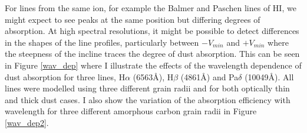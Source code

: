 For lines from the same ion, for example the Balmer and Paschen lines of 
HI, we might expect to see peaks at the same position but differing 
degrees of absorption. At high spectral resolutions, it might be possible 
to detect differences in the shapes of the line profiles, particularly 
between $-V_{min}$ and $+V_{min}$ where the steepness of the incline 
traces the degree of dust absorption.  This can be seen in Figure 
\ref{wav_dep} where I illustrate the effects of the wavelength dependence 
of dust absorption for three lines, H$\alpha$ (6563\AA), H$\beta$ 
(4861\AA) and Pa$\delta$ (10049\AA).  All lines were modelled using three 
different grain radii and for both optically thin and thick dust cases.  
I also show the variation of the absorption efficiency with wavelength 
for three different amorphous carbon grain radii in Figure \ref{wav_dep2}.
%
%

